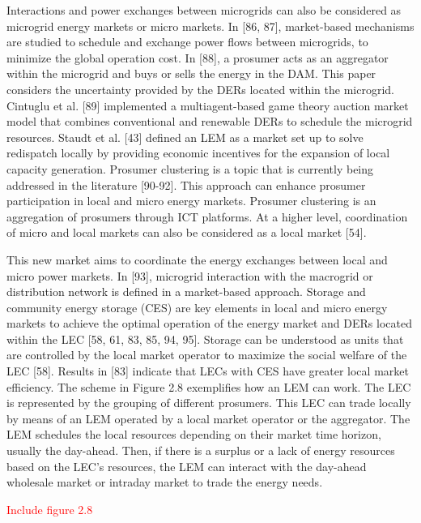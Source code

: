 Interactions and power exchanges between microgrids can also be considered as microgrid energy markets or micro markets. In [86, 87], market-based mechanisms are studied to schedule and exchange power flows between microgrids, to minimize the global operation cost. In [88], a prosumer acts as an aggregator within the microgrid and buys or sells the energy in the DAM. This paper considers the uncertainty provided by the DERs located within the microgrid. Cintuglu et al. [89] implemented a multiagent-based game theory auction market model that combines conventional and renewable DERs to schedule the microgrid resources. Staudt et al. [43] defined an LEM as a market set up to solve redispatch locally by providing economic incentives for the expansion of local capacity generation.
Prosumer clustering is a topic that is currently being addressed in the literature [90-92]. This approach can enhance prosumer participation in local and micro energy markets. Prosumer clustering is an aggregation of prosumers through ICT platforms.
At a higher level, coordination of micro and local markets can also be considered as a local market [54].

This new market aims to coordinate the energy exchanges between local and micro power markets. In [93], microgrid interaction with the macrogrid or distribution network is defined in a market-based approach. 
Storage and community energy storage (CES) are key elements in local and micro energy markets to achieve the optimal operation of the energy market and DERs located within the LEC [58, 61, 83, 85, 94, 95]. Storage can be understood as units that are controlled by the local market operator to maximize the social welfare of the LEC [58]. Results in [83] indicate that LECs with CES have greater local market efficiency. 
The scheme in Figure 2.8 exemplifies how an LEM can work. The LEC is represented by the grouping of different prosumers. This LEC can trade locally by means of an LEM operated by a local market operator or the aggregator. The LEM schedules the local resources depending on their market time horizon, usually the day-ahead. Then, if there is a surplus or a lack of energy resources based on the LEC's resources, the LEM can interact with the day-ahead wholesale market or intraday market to trade the energy needs.

\textcolor{red}{Include figure 2.8}

